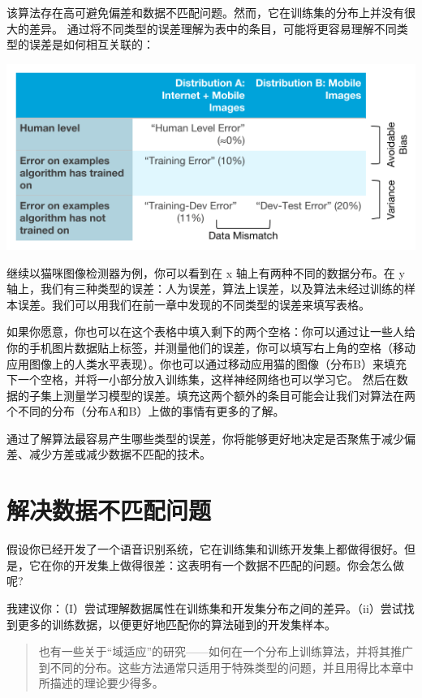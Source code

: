该算法存在高可避免偏差和数据不匹配问题。然而，它在训练集的分布上并没有很大的差异。
通过将不同类型的误差理解为表中的条目，可能将更容易理解不同类型的误差是如何相互关联的：

\includegraphics{./img/ch41_01.png}

继续以猫咪图像检测器为例，你可以看到在 x 轴上有两种不同的数据分布。在 y
轴上，我们有三种类型的误差：人为误差，算法上误差，以及算法未经过训练的样本误差。我们可以用我们在前一章中发现的不同类型的误差来填写表格。

如果你愿意，你也可以在这个表格中填入剩下的两个空格：你可以通过让一些人给你的手机图片数据贴上标签，并测量他们的误差，你可以填写右上角的空格（移动应用图像上的人类水平表现）。你也可以通过移动应用猫的图像（分布B）来填充下一个空格，并将一小部分放入训练集，这样神经网络也可以学习它。
然后在数据的子集上测量学习模型的误差。填充这两个额外的条目可能会让我们对算法在两个不同的分布（分布A和B）上做的事情有更多的了解。

通过了解算法最容易产生哪些类型的误差，你将能够更好地决定是否聚焦于减少偏差、减少方差或减少数据不匹配的技术。

\hypertarget{ux89e3ux51b3ux6570ux636eux4e0dux5339ux914dux95eeux9898}{%
\chapter{解决数据不匹配问题}\label{ux89e3ux51b3ux6570ux636eux4e0dux5339ux914dux95eeux9898}}

假设你已经开发了一个语音识别系统，它在训练集和训练开发集上都做得很好。但是，它在你的开发集上做得很差：这表明有一个数据不匹配的问题。你会怎么做呢?

我建议你：（I）尝试理解数据属性在训练集和开发集分布之间的差异。（ii）尝试找到更多的训练数据，以便更好地匹配你的算法碰到的开发集样本。

\begin{quote}
也有一些关于``域适应''的研究------如何在一个分布上训练算法，并将其推广到不同的分布。这些方法通常只适用于特殊类型的问题，并且用得比本章中所描述的理论要少得多。
\end{quote}

